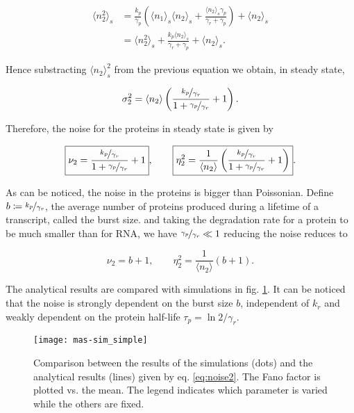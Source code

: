 \begin{align*}
  \langle n_2^2\rangle_s &= \frac{k_p}{\gamma_p}\left(\langle n_1 \rangle_s\langle n_2\rangle_s + \frac{\langle n_2\rangle_s\gamma_p}{\gamma_r+\gamma_p}\right) + \langle n_2 \rangle_s\\
  &=\langle n_2^2\rangle_s+\frac{k_p\langle n_2\rangle_s}{\gamma_r+\gamma_p}+\langle n_2 \rangle_s.
\end{align*}

Hence substracting $\langle n_2\rangle_s^2$ from the previous equation we obtain, in steady state,

\begin{equation*}
  \sigma_2^2 = \langle n_2\rangle\left(\frac{\nicefrac{k_p}{\gamma_r}}{1+\nicefrac{\gamma_p}{\gamma_r}}+1\right).
\end{equation*}

Therefore, the noise for the proteins in steady state is given by

\begin{equation}
  \label{eq:noise2}
  \boxed{\nu_2 = \frac{\nicefrac{k_p}{\gamma_r}}{1+\nicefrac{\gamma_p}{\gamma_r}}+1}, \quad \quad \boxed{\eta_2^2 = \frac{1}{\langle n_2\rangle}\left(\frac{\nicefrac{k_p}{\gamma_r}}{1+\nicefrac{\gamma_p}{\gamma_r}}+1\right)}.
\end{equation}

As can be noticed, the noise in the proteins is bigger than Poissonian. Define $b\coloneqq \nicefrac{k_p}{\gamma_r}$, the average number of proteins produced during a lifetime of a transcript, called the burst size. and taking the degradation rate for a protein to be much smaller than for RNA, we have $\nicefrac{\gamma_p}{\gamma_r} \ll 1$ reducing the noise reduces to

\begin{equation*}
  \nu_2 = b+1, \quad \quad \eta_2^2 = \frac{1}{\langle n_2\rangle}\left(b+1\right).
\end{equation*}

The analytical results are compared with simulations in fig. \ref{fig:mas-sim_simple}. It can be noticed that the noise is strongly dependent on the burst size $b$, independent of $k_r$ and weakly dependent on the protein half-life $\tau_p = \ln2/\gamma_r$.


\begin{figure}[H]
  \centering
  \texttt{[image: mas-sim\_simple]}
  \caption[Noise in proteins: comparing analytical results and simulations]{\label{fig:mas-sim_simple} Comparison between the results of the simulations (dots) and the analytical results (lines) given by eq. \eqref{eq:noise2}. The Fano factor is plotted vs. the mean. The legend indicates which parameter is varied while the others are fixed.}
\end{figure}

